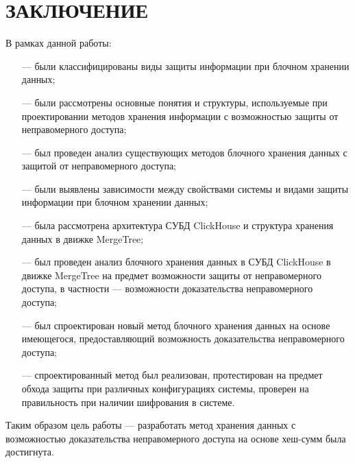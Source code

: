 \section*{ЗАКЛЮЧЕНИЕ}

В рамках данной работы:
\begin{itemize}
	\item [---] были классифицированы виды защиты информации при блочном хранении данных;
	\item [---] были рассмотрены основные понятия и структуры, используемые при проектировании методов хранения информации с возможностью защиты от неправомерного доступа;
	\item [---] был проведен анализ существующих методов блочного хранения данных с защитой от неправомерного доступа;
	\item [---] были выявлены зависимости между свойствами системы и видами защиты информации при блочном хранении данных;
	\item [---] была рассмотрена архитектура СУБД ClickHouse и структура хранения данных в движке MergeTree;
	\item [---] был проведен анализ блочного хранения данных в СУБД ClickHouse в движке MergeTree на предмет возможности защиты от неправомерного доступа, в частности --- возможности доказательства неправомерного доступа;
	\item [---] был спроектирован новый метод блочного хранения данных на основе имеющегося, предоставляющий возможность доказательства неправомерного доступа;
	\item [---] спроектированный метод был реализован, протестирован на предмет обхода защиты при различных конфигурациях системы, проверен на правильность при наличии шифрования в системе.
\end{itemize}

Таким образом цель работы --- разработать метод хранения данных с возможностью доказательства неправомерного доступа на основе хеш-сумм была достигнута.

\pagebreak